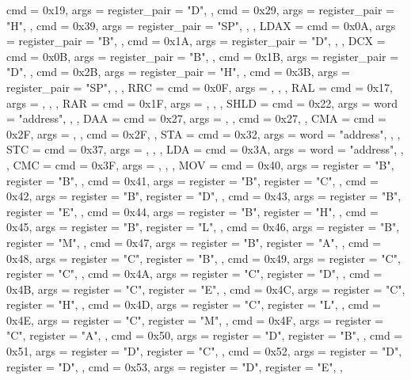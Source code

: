 {{        { cmd = 0x19, args = {{register_pair = "D"}}, },
        { cmd = 0x29, args = {{register_pair = "H"}}, },
        { cmd = 0x39, args = {{register_pair = "SP"}}, },
    },
    LDAX = {
        { cmd = 0x0A, args = {{register_pair = "B"}}, },
        { cmd = 0x1A, args = {{register_pair = "D"}}, },
    },
    DCX  = {
        { cmd = 0x0B, args = {{register_pair = "B"}}, },
        { cmd = 0x1B, args = {{register_pair = "D"}}, },
        { cmd = 0x2B, args = {{register_pair = "H"}}, },
        { cmd = 0x3B, args = {{register_pair = "SP"}}, },
    },
    RRC  = {
        { cmd = 0x0F, args = {}, },
    },
    RAL  = {
        { cmd = 0x17, args = {}, },
    },
    RAR  = {
        { cmd = 0x1F, args = {}, },
    },
    SHLD = {
        { cmd = 0x22, args = {{word = "address"}}, },
    },
    DAA  = {
        { cmd = 0x27, args = {}, },
        cmd = 0x27,
    },
    CMA  = {
        { cmd = 0x2F, args = {}, },
        cmd = 0x2F,
    },
    STA  = {
        { cmd = 0x32, args = {{word = "address"}}, },
    },
    STC  = {
        { cmd = 0x37, args = {}, },
    },
    LDA  = {
        { cmd = 0x3A, args = {{word = "address"}}, },
    },
    CMC  = {
        { cmd = 0x3F, args = {}, },
    },
    MOV  = {
        { cmd = 0x40, args = {{register = "B"}, {register = "B"}}, },
        { cmd = 0x41, args = {{register = "B"}, {register = "C"}}, },
        { cmd = 0x42, args = {{register = "B"}, {register = "D"}}, },
        { cmd = 0x43, args = {{register = "B"}, {register = "E"}}, },
        { cmd = 0x44, args = {{register = "B"}, {register = "H"}}, },
        { cmd = 0x45, args = {{register = "B"}, {register = "L"}}, },
        { cmd = 0x46, args = {{register = "B"}, {register = "M"}}, },
        { cmd = 0x47, args = {{register = "B"}, {register = "A"}}, },
        { cmd = 0x48, args = {{register = "C"}, {register = "B"}}, },
        { cmd = 0x49, args = {{register = "C"}, {register = "C"}}, },
        { cmd = 0x4A, args = {{register = "C"}, {register = "D"}}, },
        { cmd = 0x4B, args = {{register = "C"}, {register = "E"}}, },
        { cmd = 0x4C, args = {{register = "C"}, {register = "H"}}, },
        { cmd = 0x4D, args = {{register = "C"}, {register = "L"}}, },
        { cmd = 0x4E, args = {{register = "C"}, {register = "M"}}, },
        { cmd = 0x4F, args = {{register = "C"}, {register = "A"}}, },
        { cmd = 0x50, args = {{register = "D"}, {register = "B"}}, },
        { cmd = 0x51, args = {{register = "D"}, {register = "C"}}, },
        { cmd = 0x52, args = {{register = "D"}, {register = "D"}}, },
        { cmd = 0x53, args = {{register = "D"}, {register = "E"}}, },
}}
